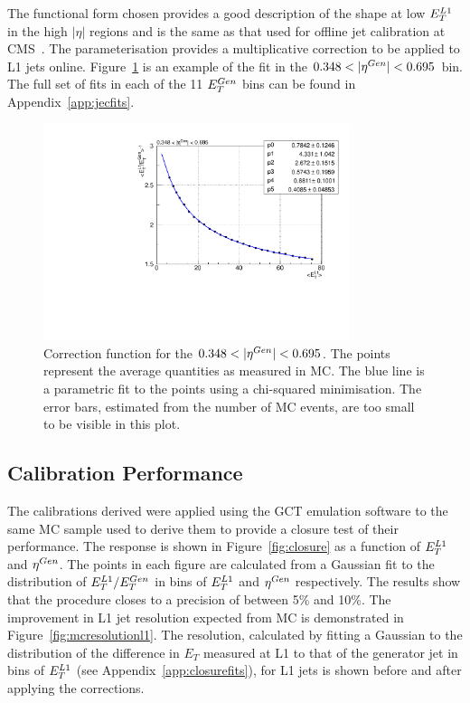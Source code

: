 The functional form chosen provides a good description of the shape at low $E_{T}^{L1}$ in the high $|\eta|$ regions 
and is the same as that used for offline jet calibration at CMS~\citep{jetcalib}.
The parameterisation provides a multiplicative correction to be applied to L1 jets online. 
Figure~\ref{fig:egcorrfunc} is an example of the fit in the $0.348 < |\eta^{Gen}| < 0.695$ bin.
The full set of fits in each of the 11 $E_{T}^{Gen}$ bins can be found in Appendix~\ref{app:jecfits}.

\begin{figure}
\begin{center}
\includegraphics[width=0.8\textwidth]{detector/l1jet/egcorrfunc.pdf}
\caption{Correction function for the $0.348 < |\eta^{Gen}| < 0.695$. The points represent the average
quantities as measured in MC. The blue line is a parametric fit to the points 
using a chi-squared minimisation. The error bars, estimated from the number of MC events, are too small 
to be visible in this plot.}
\end{center}
\label{fig:egcorrfunc}
\end{figure}

\subsection{Calibration Performance}
The calibrations derived were applied using the GCT emulation software to the same MC sample 
used to derive them to provide a closure test of their performance. 
The response is shown in Figure~\ref{fig:closure}
as a function of $E_{T}^{L1}$ and $\eta^{Gen}$. The points in each figure are calculated from a Gaussian fit to the distribution
of $E_{T}^{L1}/E_{T}^{Gen}$ in bins of $E_{T}^{L1}$ and $\eta^{Gen}$ respectively. 
The results show that the procedure closes
to a precision of between 5\% and 10\%. The improvement in L1 jet resolution expected from MC
is demonstrated in Figure~\ref{fig:mcresolutionl1}. The resolution, calculated by fitting a Gaussian to the distribution
of the difference in $E_{T}$ measured at L1 to that of the generator jet 
in bins of $E_{T}^{L1}$ (see Appendix~\ref{app:closurefits}), for L1 jets is shown before and after applying the
corrections. 
 
